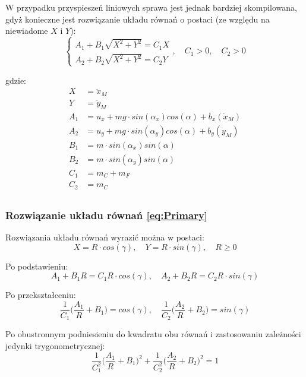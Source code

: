 \documentclass[10pt]{article}
\begin{document}
W przypadku przyspieszeń liniowych sprawa jest jednak bardziej skompilowana, gdyż konieczne jest rozwiązanie układu równań o postaci (ze względu na niewiadome $X$ i $Y$):
\begin{equation}
\begin{cases}
A_1+B_1\sqrt{X^2 + Y^2} = C_1X \\ 
A_2+B_2\sqrt{X^2 + Y^2} = C_2Y
\end{cases}, \quad C_1 > 0, \quad C_2 > 0
\label{eq:Primary}
\end{equation}

gdzie:
\begin{equation*}
\begin{split}
X &= \ddot{x}_M \\
Y &= \ddot{y}_M \\
A_1 &= u_x + mg \cdot sin(\alpha_x)cos(\alpha) + b_x(\dot{x}_M) \\
A_2 &= u_y + mg \cdot sin(\alpha_y)cos(\alpha) + b_y(\dot{y}_M) \\
B_1 &= m \cdot sin(\alpha_x) sin(\alpha) \\
B_2 &= m \cdot sin(\alpha_y) sin(\alpha) \\
C_1 &= m_C + m_F \\
C_2 &= m_C \\
\end{split}
\end{equation*}

\newpage
\subsubsection*{Rozwiązanie układu równań \eqref{eq:Primary}}
Rozwiązania układu równań wyrazić można w postaci:
\begin{equation}
X = R \cdot cos(\gamma), \quad Y = R \cdot sin(\gamma), \quad R \geqslant 0
\label{eq:VarChng}
\end{equation}

Po podstawieniu:
\begin{equation}
A_1 + B_1 R = C_1 R \cdot cos(\gamma), \quad
A_2 + B_2 R = C_2 R \cdot sin(\gamma)
\end{equation}

Po przekształceniu:
\begin{equation}
\frac{1}{C_1} \Big( \frac{A_1}{R} + B_1 \Big) = cos(\gamma), \quad
\frac{1}{C_2} \Big( \frac{A_2}{R} + B_2 \Big) = sin(\gamma)
\label{eg:TrigForm}
\end{equation}

Po obustronnym podniesieniu do kwadratu obu równań i zastosowaniu zależności jedynki trygonometrycznej:
\begin{equation}
\frac{1}{C_1^2} \Big( \frac{A_1}{R} + B_1 \Big)^2 + 
\frac{1}{C_2^2} \Big( \frac{A_2}{R} + B_2 \Big)^2 = 1
\end{equation}
\end{document}
